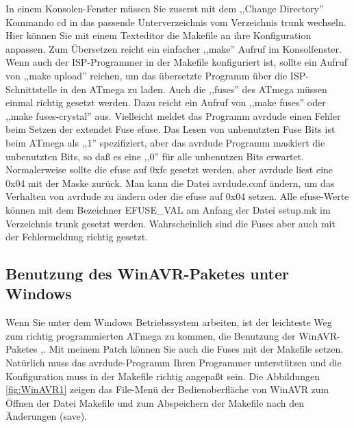 In einem Konsolen-Fenster müssen Sie zuserst mit dem ,,Change Directory'' Kommando cd in das passende 
Unterverzeichnis vom Verzeichnis trunk wechseln.
Hier können Sie mit einem Texteditor die Makefile an ihre Konfiguration anpassen.
Zum Übersetzen reicht ein einfacher ,,make'' Aufruf im Konsolfenster.
Wenn auch der ISP-Programmer in der Makefile konfiguriert ist, sollte ein Aufruf von ,,make upload''
reichen, um das übersetzte Programm über die ISP-Schnittstelle in den ATmega zu laden.
Auch die ,,fuses'' des ATmega müssen einmal richtig gesetzt werden.
Dazu reicht ein Aufruf von ,,make fuses'' oder ,,make fuses-crystal'' aus.
Vielleicht meldet das Programm avrdude einen Fehler beim Setzen der extendet Fuse efuse.
Das Lesen von unbenutzten Fuse Bits ist beim ATmega als ,,1'' spezifiziert, aber
das avrdude Programm maskiert die unbenutzten Bits, so daß es eine ,,0'' für alle unbenutzen Bits erwartet.
Normalerweise sollte die efuse auf 0xfc gesetzt werden, aber avrdude liest eine 0x04 mit der Maske zurück.
Man kann die Datei avrdude.conf ändern, um das Verhalten von avrdude zu ändern oder
die efuse auf 0x04 setzen. 
Alle efuse-Werte können mit dem Bezeichner EFUSE\_VAL am Anfang der Datei setup.mk im Verzeichnis trunk
gesetzt werden. Wahrscheinlich sind die Fuses aber auch mit der Fehlermeldung richtig gesetzt.



\subsection{Benutzung des WinAVR-Paketes unter Windows}
Wenn Sie unter dem Windows Betriebssystem arbeiten, ist der leichteste Weg zum
richtig programmierten ATmega zu kommen, die Benutzung der WinAVR-Paketes \cite{winavr1},\cite{winavr2}.
Mit meinem Patch \cite{winavr3} können Sie auch die Fuses mit der Makefile setzen.
Natürlich muss das avrdude-Programm Ihren Programmer unterstützen und die Konfiguration muss in
der Makefile richtig angepaßt sein.
Die Abbildungen \ref{fig:WinAVR1} zeigen das File-Menü der Bedienoberfläche von WinAVR zum
Öffnen der Datei Makefile und zum Abspeichern der Makefile nach den Änderungen (save).

